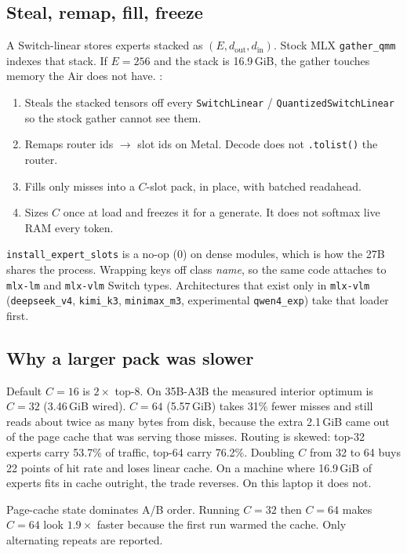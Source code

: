 \subsection{Steal, remap, fill, freeze}

A Switch-linear stores experts stacked as $(E, d_{\mathrm{out}}, d_{\mathrm{in}})$. Stock MLX \texttt{gather\_qmm} indexes that stack. If $E{=}256$ and the stack is 16.9\,GiB, the gather touches memory the Air does not have. \slotbank{}:

\begin{enumerate}[leftmargin=1.4em]
\item Steals the stacked tensors off every \texttt{SwitchLinear} / \texttt{QuantizedSwitchLinear} so the stock gather cannot see them.
\item Remaps router ids $\to$ slot ids on Metal. Decode does not \texttt{.tolist()} the router.
\item Fills only misses into a $C$-slot pack, in place, with batched readahead.
\item Sizes $C$ once at load and freezes it for a generate. It does not softmax live RAM every token.
\end{enumerate}

\texttt{install\_expert\_slots} is a no-op ($0$) on dense modules, which is how the 27B shares the process. Wrapping keys off class \emph{name}, so the same code attaches to \texttt{mlx-lm} and \texttt{mlx-vlm} Switch types. Architectures that exist only in \texttt{mlx-vlm} (\texttt{deepseek\_v4}, \texttt{kimi\_k3}, \texttt{minimax\_m3}, experimental \texttt{qwen4\_exp}) take that loader first.

\subsection{Why a larger pack was slower}

Default $C{=}16$ is $2\times$ top-8. On 35B-A3B the measured interior optimum is $C{=}32$ (3.46\,GiB wired). $C{=}64$ (5.57\,GiB) takes 31\% fewer misses and still reads about twice as many bytes from disk, because the extra 2.1\,GiB came out of the page cache that was serving those misses. Routing is skewed: top-32 experts carry 53.7\% of traffic, top-64 carry 76.2\%. Doubling $C$ from 32 to 64 buys 22 points of hit rate and loses linear cache. On a machine where 16.9\,GiB of experts fits in cache outright, the trade reverses. On this laptop it does not.

Page-cache state dominates A/B order. Running $C{=}32$ then $C{=}64$ makes $C{=}64$ look $1.9\times$ faster because the first run warmed the cache. Only alternating repeats are reported.

